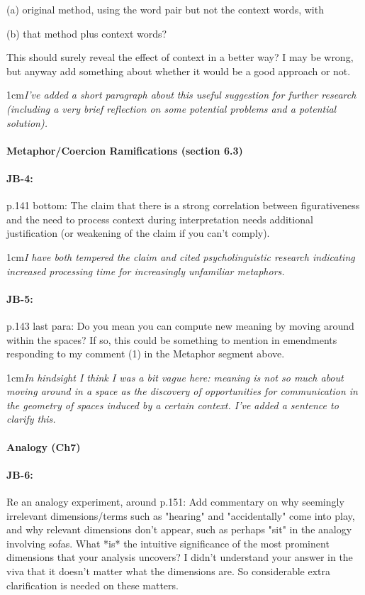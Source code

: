 \documentclass[11pt,a4paper]{article}
\newcommand{\res}[1]{\vspace{0.25cm} \begin{adjustwidth}{1cm}{}\emph{#1}\end{adjustwidth}}
\begin{document}
(a) original method, using the word pair but not the context words, with

(b) that method plus context words?

This should surely reveal the effect of context in a better way? I may be wrong, but anyway add something about whether it would be a good approach or not.

\res{I've added a short paragraph about this useful suggestion for further research (including a very brief reflection on some potential problems and a potential solution).}


\paragraph{Metaphor/Coercion Ramifications (section 6.3)}

\paragraph{JB-4:} p.141 bottom: The claim that there is a strong correlation between figurativeness and the need to process context during interpretation needs additional justification (or weakening of the claim if you can't comply).

\res{I have both tempered the claim and cited psycholinguistic research indicating increased processing time for increasingly unfamiliar metaphors.}

\paragraph{JB-5:} p.143 last para: Do you mean you can compute new meaning by moving around within the spaces? If so, this could be something to mention in emendments responding to my comment (1) in the Metaphor segment above.

\res{In hindsight I think I was a bit vague here: meaning is not so much about moving around in a space as the discovery of opportunities for communication in the geometry of spaces induced by a certain context.  I've added a sentence to clarify this.}


\paragraph{Analogy  (Ch7)}

\paragraph{JB-6:} Re an analogy experiment, around p.151: Add commentary on why seemingly irrelevant dimensions/terms such as "hearing" and "accidentally" come into play, and why relevant dimensions don't appear, such as perhaps "sit" in the analogy involving sofas. What *is* the intuitive significance of the most prominent dimensions that your analysis uncovers? I didn't understand your answer in the viva that it doesn't matter what the dimensions are. So considerable extra clarification is needed on these matters.
\end{document}

